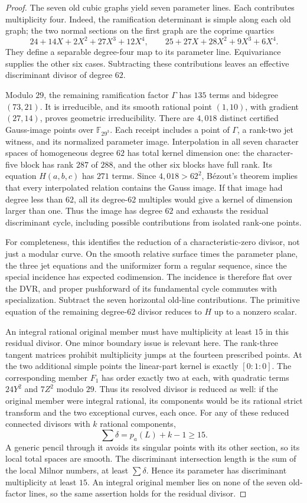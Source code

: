 \begin{proof}
The seven old cubic graphs yield seven parameter lines. Each contributes
multiplicity four. Indeed, the ramification determinant is simple along
each old graph; the two normal sections on the first graph are the
coprime quartics
\[
 24+14X+2X^2+27X^3+12X^4,\qquad
 25+27X+28X^2+9X^3+6X^4.
\]
They define a separable degree-four map to its parameter line.
Equivariance supplies the other six cases. Subtracting these contributions
leaves an effective discriminant divisor of degree $62$.

Modulo $29$, the remaining ramification factor $\Gamma$ has $135$ terms
and bidegree $(73,21)$. It is irreducible, and its smooth rational point
$(1,10)$, with gradient $(27,14)$, proves geometric irreducibility.
There are $4,018$ distinct certified Gauss-image points over $\mathbb
F_{29^3}$. Each receipt includes a point of $\Gamma$, a rank-two jet
witness, and its normalized parameter image. Interpolation in all seven
character spaces of homogeneous degree $62$ has total kernel dimension
one: the character-five block has rank $287$ of $288$, and the other six
blocks have full rank. Its equation $H(a,b,c)$ has $271$ terms.
Since $4,018>62^2$, B\'ezout's theorem implies that every interpolated
relation contains the Gauss image. If that image had degree less than
$62$, all its degree-$62$ multiples would give a kernel of dimension
larger than one. Thus the image has degree $62$ and exhausts the residual
discriminant cycle, including possible contributions from isolated
rank-one points.

For completeness, this identifies the reduction of a characteristic-zero
divisor, not just a modular curve. On the smooth relative surface times
the parameter plane, the three jet equations and the uniformizer form a
regular sequence, since the special incidence has expected codimension.
The incidence is therefore flat over the DVR, and proper pushforward of
its fundamental cycle commutes with specialization. Subtract the seven
horizontal old-line contributions. The primitive equation of the
remaining degree-$62$ divisor reduces to $H$ up to a nonzero scalar.

An integral rational original member must have multiplicity at least
$15$ in this residual divisor. One minor boundary issue is relevant here.
The rank-three tangent matrices prohibit multiplicity jumps at the
fourteen prescribed points. At the two additional simple points the
linear-part kernel is exactly $[0:1:0]$. The corresponding member $F_1$
has order exactly two at each, with quadratic terms $24Y^2$ and $7Z^2$
modulo $29$. Thus its resolved divisor is reduced as well: if the
original member were integral rational, its components would be its
rational strict transform and the two exceptional curves, each once.
For any of these reduced connected divisors with $k$ rational components,
\[
 \sum\delta=p_a(L)+k-1\ge15.
\]
A generic pencil through it avoids its singular points with its other
section, so its local total spaces are smooth. The discriminant
intersection length is the sum of the local Milnor numbers, at least
$\sum\delta$. Hence its parameter has discriminant multiplicity at
least $15$. An integral original member lies on none of the seven
old-factor lines, so the same assertion holds for the residual divisor.


\end{proof}
